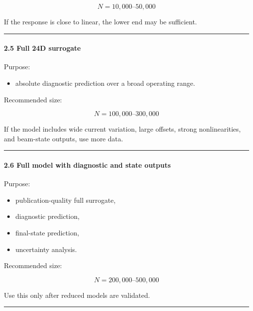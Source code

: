 \documentclass[
]{article}
\providecommand{\tightlist}{%
  \setlength{\itemsep}{0pt}\setlength{\parskip}{0pt}}
\begin{document}
\[
N = 10{,}000\text{--}50{,}000
\]

If the response is close to linear, the lower end may be sufficient.

\begin{center}\rule{0.5\linewidth}{0.5pt}\end{center}

\hypertarget{full-24d-surrogate}{%
\paragraph{2.5 Full 24D surrogate}\label{full-24d-surrogate}}

Purpose:

\begin{itemize}
\tightlist
\item
  absolute diagnostic prediction over a broad operating range.
\end{itemize}

Recommended size:

\[
N = 100{,}000\text{--}300{,}000
\]

If the model includes wide current variation, large offsets, strong
nonlinearities, and beam-state outputs, use more data.

\begin{center}\rule{0.5\linewidth}{0.5pt}\end{center}

\hypertarget{full-model-with-diagnostic-and-state-outputs}{%
\paragraph{2.6 Full model with diagnostic and state
outputs}\label{full-model-with-diagnostic-and-state-outputs}}

Purpose:

\begin{itemize}
\tightlist
\item
  publication-quality full surrogate,
\item
  diagnostic prediction,
\item
  final-state prediction,
\item
  uncertainty analysis.
\end{itemize}

Recommended size:

\[
N = 200{,}000\text{--}500{,}000
\]

Use this only after reduced models are validated.

\begin{center}\rule{0.5\linewidth}{0.5pt}\end{center}
\end{document}
